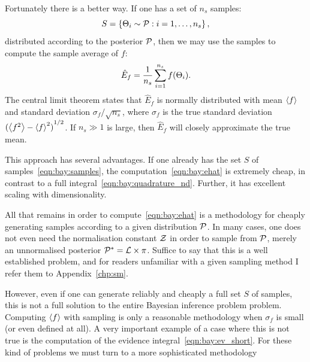 Fortunately there is a better way. If one has a set of \(n_s\) samples:
\begin{equation}
  S = \left\{ \Theta_i\sim\mathcal{P}:i=1,\ldots,n_s \right\},
  \label{eqn:bay:samples}
\end{equation}
distributed according to the posterior \(\mathcal{P}\), then we may use the samples to compute the sample average of \(f\):
\begin{equation}
  \hat{E}_f = \frac{1}{n_s}\sum\limits_{i=1}^{n_s} f(\Theta_i).
  \label{eqn:bay:ehat}
\end{equation}
The central limit theorem states that \(\hat{E}_f\) is normally distributed with mean \({\left\langle{f}\right\rangle}\) and standard deviation \(\sigma_f/\sqrt{n_s}\), where \(\sigma_f\) is the true standard deviation \({({\left\langle{f^2}\right\rangle}-{\left\langle{f}\right\rangle}^2)}^{1/2}\). If \(n_s\gg 1\) is large, then \(\hat{E}_f\) will closely approximate the true mean. 

This approach has several advantages. If one already has the set \(S\) of samples~\eqref{eqn:bay:samples}, the computation~\eqref{eqn:bay:ehat} is extremely cheap, in contrast to a full integral~\eqref{eqn:bay:quadrature_nd}. Further, it has excellent scaling with dimensionality. 

All that remains in order to compute~\eqref{eqn:bay:ehat} is a methodology for cheaply generating samples according to a given distribution \(\mathcal{P}\). In many cases, one does not even need the normalisation constant \(\mathcal{Z}\) in order to sample from \(\mathcal{P}\), merely an unnormalised posterior \({\mathcal{P}}^\ast= \mathcal{L}\times\pi\). Suffice to say that this is a well established problem, and for readers unfamiliar with a given sampling method I refer them to Appendix~\ref{chp:sm}.

However, even if one can generate reliably and cheaply a full set \(S\) of samples, this is not a full solution to the entire Bayesian inference problem problem. Computing \({\left\langle{f}\right\rangle}\) with sampling is only a reasonable methodology when \(\sigma_f\) is small (or even defined at all). A very important example of a case where this is not true is the computation of the evidence integral~\eqref{eqn:bay:ev_short}. For these kind of problems we must turn to a more sophisticated methodology



